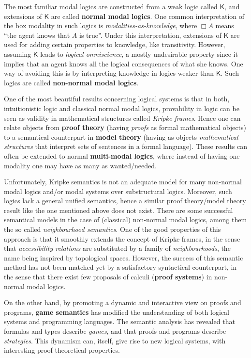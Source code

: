 \documentclass[11pt,a4paper]{article}
\newcommand{\K}{\mathsf{K}}
\begin{document}
The most familiar modal logics are constructed from a 
weak 
logic called $\K$, and extensions of $\K$ are called {\bf normal modal logics}. 
One common interpretation of the box modality in such logics is {\em modalities-as-knowledge}, where $\Box A$ means ``the agent knows that $A$ is true''. Under this interpretation, extensions of $\K$ 
are used for adding certain properties to knowledge, like transitivity.
However, assuming $\K$ leads to {\em logical omniscience}, a mostly undesirable property since it implies that an agent knows all the logical consequences of what she knows. 
One way of avoiding this is by interpreting knowledge in logics weaker than $\K$. Such logics 
are called {\bf non-normal modal logics}.



One of the most beautiful  results concerning logical systems is that in both, intuitionistic logic and classical normal modal logics, provability in logic can be seen as validity in  mathematical structures called {\em Kripke frames}. Hence one can relate objects from {\bf proof theory} (having {\em proofs} as formal mathematical objects) to a semantical counterpart in {\bf  model theory} (having as objects {\em mathematical structures} that interpret sets of sentences in a formal language). 
These results can often be extended to normal {\bf multi-modal logics}, where instead of having one modality one may have as many as wanted/needed.

Unfortunately, Kripke semantics is not an adequate model for many non-normal modal logics and/or modal systems over substructural logics.
Moreover, 
such logics lack a general unified semantics, hence a similar proof theory/model theory result like the one mentioned above does not exist. 
There are some successful semantical models in the case of  (classical) non-normal modal logics,  among them the so called {\em neighbourhood semantics}. One of the good properties of this approach is that it smoothly extends the concept of Kripke frames, in the sense that {\em accessibility relations} are substituted by a family of {\em neighbourhoods}, the name being inspired by topological spaces. However, the success of this semantic method has not been matched yet by a satisfactory syntactical counterpart, in the sense that there exist few proposals of calculi  ({\bf proof systems}) 
in non-normal modal logics. 

On the other hand, by promoting a dynamic and interactive view on proofs and programs, {\bf game semantics} has modified the understanding of both logical systems and programming languages. The semantic analysis has revealed that formulas and types describe {\em games}, and that proofs and programs describe {\em strategies}. 
This dynamism can, itself, give rise to new logical systems, with interesting proof theoretical properties.
\end{document}
